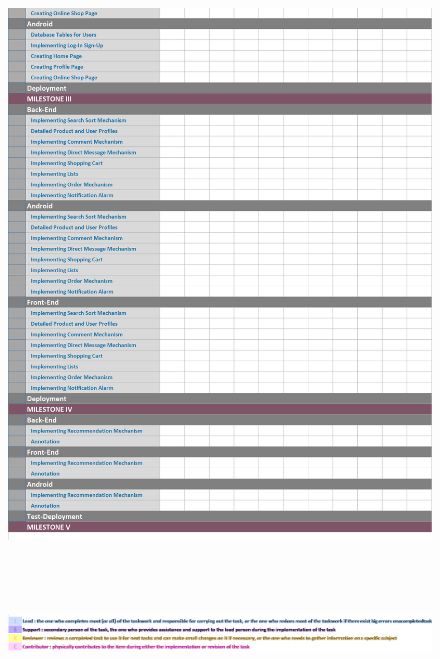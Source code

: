 \documentclass[]{article}
\begin{document}
\begin{figure}[H]
    \centering
    \includegraphics[height=7in]{./images/ram-01.png}
    \includegraphics{./images/ram-legend.png}
\end{figure}
\end{document}
